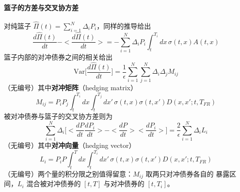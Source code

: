 \paragraph{篮子的方差与交叉协方差}
对纯篮子 $\hat{\Pi}(t)=\sum_{i=1}^{N}\Delta_iP_i$，同样的推导给出
\begin{equation*}
\frac{d\hat{\Pi}(t)}{dt}-<\frac{d\hat{\Pi}(t)}{dt}>
=-\sum_{i=1}^{N}\Delta_iP_i\int_{t}^{T_i}dx\,\sigma(t,x)A(t,x)
\tag{9.68}
\end{equation*}
篮子内部的对冲债券之间的相关给出
\begin{equation*}
\mathrm{Var}\biggl[\frac{d\hat{\Pi}(t)}{dt}\biggr]
=\frac{1}{\epsilon}\sum_{i=1}^{N}\sum_{j=1}^{N}\Delta_i\Delta_jM_{ij}
\end{equation*}
（无编号）其中\textbf{对冲矩阵}（hedging matrix）
\begin{equation*}
M_{ij}=P_iP_j\int_{t}^{T_i}dx\int_{t}^{T_j}dx'\,
\sigma(t,x)\sigma(t,x')D(x,x';t,T_{FR})\tag{9.69}
\end{equation*}
被对冲债券与篮子的交叉协方差则为
\begin{equation*}
\sum_{i=1}^{N}\Delta_i\biggl[<\frac{dP}{dt}\frac{dP_i}{dt}>
-<\frac{dP}{dt}><\frac{dP_i}{dt}>\biggr]
=\frac{2}{\epsilon}\sum_{i=1}^{N}\Delta_iL_i
\end{equation*}
（无编号）其中\textbf{对冲向量}（hedging vector）
\begin{equation*}
L_i=P_iP\int_{t}^{T}dx\int_{t}^{T_i}dx'\,
\sigma(t,x)\sigma(t,x')D(x,x';t,T_{FR})
\end{equation*}
（无编号）两个量的积分限之别值得留意：$M_{ij}$ 取两只对冲债券各自的
暴露区间，$L_i$ 混合被对冲债券的 $[t,T]$ 与对冲债券的 $[t,T_i]$。

